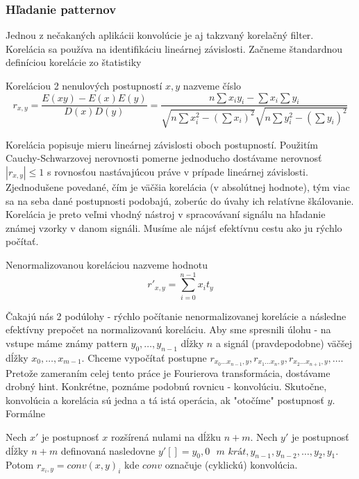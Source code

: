 \subsubsection{Hľadanie patternov}
Jednou z nečakaných aplikácii konvolúcie je aj takzvaný korelačný
filter. Korelácia sa používa na identifikáciu lineárnej závislosti.
Začneme štandardnou definíciou korelácie zo štatistiky
\begin{definicia}[Korelácia]
  Koreláciou 2 nenulových postupností $x,y$ nazveme číslo
  \begin{equation}
    r_{x,y} = \frac{E(xy)-E(x)E(y)}{D(x)D(y)} =
        \frac{n \sum x_i y_i - \sum x_i \sum y_i}{
        \sqrt{n \sum x_i^2 - (\sum x_i)^2}
        \sqrt{n \sum y_i^2 - (\sum y_i)^2}}
  \end{equation}
\end{definicia}
Korelácia popisuje mieru lineárnej závislosti oboch postupností.
Použitím Cauchy-Schwarzovej nerovnosti pomerne jednoducho dostávame
nerovnosť $|r_{x,y}| \le 1$ s rovnosťou nastávajúcou práve v prípade
lineárnej závislosti. Zjednodušene povedané, čím je väčšia korelácia
(v absolútnej hodnote), tým viac sa na seba dané postupnosti podobajú,
zoberúc do úvahy ich relatívne škálovanie. Korelácia je preto veľmi
vhodný nástroj v spracovávaní signálu na hľadanie známej vzorky v
danom signáli. Musíme ale nájsť efektívnu cestu ako ju rýchlo počítať.
\begin{definicia}
    Nenormalizovanou koreláciou nazveme hodnotu
    \begin{equation}
        r'_{x,y} = \sum_{i=0}^{n-1} x_i t_y
    \end{equation}
\end{definicia}
Čakajú nás 2 podúlohy - rýchlo počítanie nenormalizovanej korelácie a
následne efektívny prepočet na normalizovanú koreláciu.
Aby sme spresnili úlohu - na vstupe máme známy pattern $y_0,\dots,y_{n-1}$
dĺžky $n$ a signál (pravdepodobne) väčšej dĺžky $x_0,\dots, x_{m-1}$.
Chceme vypočítať postupne
$r_{x_0\dots x_{n-1},y}, r_{x_1\dots x_n,y}, r_{x_2\dots x_{n+1},y},\dots$.
Pretože zameraním celej tento práce je Fourierova transformácia,
dostávame drobný hint. Konkrétne, poznáme podobnú rovnicu - konvolúciu.
Skutočne, konvolúcia a korelácia sú jedna a tá istá operácia, ak
"otočíme" postupnosť $y$.
Formálne
\begin{lema}
    Nech $x'$ je postupnosť $x$ rozšírená nulami na dĺžku $n+m$.
    Nech $y'$ je postupnosť dĺžky $n+m$ definovaná nasledovne
        $y'[]=y_0, 0 \textit{ $m$ krát}, y_{n-1}, y_{n-2}, \dots, y_2, y_1$.
    Potom $r_{x_i,y} = conv(x,y)_i$ kde $conv$ označuje (cyklickú)
    konvolúcia.
\end{lema}
